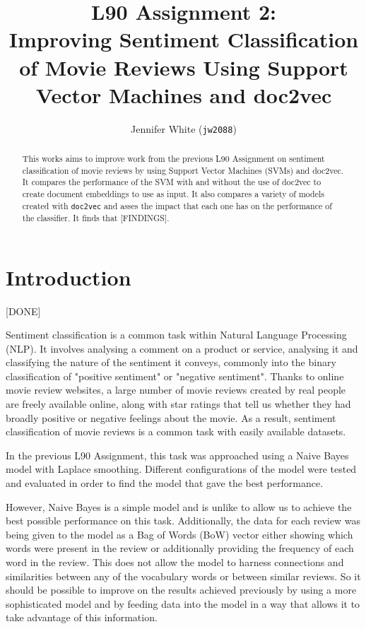 \documentclass[twocolumn]{article}
\title{ L90 Assignment 2:\\
	Improving Sentiment Classification of Movie Reviews Using Support Vector Machines and doc2vec }
\author{Jennifer White (\texttt{jw2088})}
\begin{document}
\maketitle
\begin{abstract}
This works aims to improve work from the previous L90 Assignment on sentiment classification of movie reviews by using Support Vector Machines (SVMs) and doc2vec. It compares the performance of the SVM with and without the use of doc2vec to create document embeddings to use as input. It also compares a variety of models created with \texttt{doc2vec} and asses the impact that each one has on the performance of the classifier. It finds that [FINDINGS].
\end{abstract}

\section{Introduction}
[DONE]

Sentiment classification is a common task within Natural Language Processing (NLP). It involves analysing a comment on a product or service, analysing it and classifying the nature of the sentiment it conveys, commonly into the binary classification of "positive sentiment" or "negative sentiment". Thanks to online movie review websites, a large number of movie reviews created by real people are freely available online, along with star ratings that tell us whether they had broadly positive or negative feelings about the movie. As a result, sentiment classification of movie reviews is a common task with easily available datasets.

In the previous L90 Assignment, this task was approached using a Naive Bayes model with Laplace smoothing. Different configurations of the model were tested and evaluated in order to find the model that gave the best performance.

However, Naive Bayes is a simple model and is unlike to allow us to achieve the best possible performance on this task. Additionally, the data for each review was being given to the model as a Bag of Words (BoW) vector either showing which words were present in the review or additionally providing the frequency of each word in the review. This does not allow the model to harness connections and similarities between any of the vocabulary words or between similar reviews. So it should be possible to improve on the results achieved previously by using a more sophisticated model and by feeding data into the model in a way that allows it to take advantage of this information.
\end{document}

